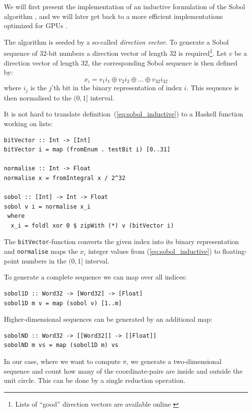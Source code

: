 \documentclass[preprint]{sigplanconf}
\begin{document}
We will first present the implementation of an inductive formulation
of the Sobol algorithm \cite{bratley1988algorithm}, and we will later get
back to a more efficient implementations optimized for GPUs
\cite[Chapter~16]{hwy2011emerald}.

The algorithm is seeded by a so-called \emph{direction vector}. To
generate a Sobol sequence of $32$-bit numbers a direction vector of
length $32$ is required\footnote{Lists of ``good'' direction vectors are
  available online \cite{homepage:sobol:directionvectors}}. Let $v$ be
a direction vector of length $32$, the corresponding Sobol sequence is
then defined by:
\begin{equation}
x_i = v_1i_1 \oplus v_2i_2 \oplus \ldots \oplus v_{32}i_{32}\label{eq:sobol_inductive}
\end{equation}
where $i_j$ is the $j$'th bit in the binary representation of index
$i$. This sequence is then normalised to the $(0,1]$ interval.

It is not hard to translate definition~(\ref{eq:sobol_inductive}) to a
Haskell function working on lists:
\begin{verbatim}
bitVector :: Int -> [Int]
bitVector i = map (fromEnum . testBit i) [0..31]

normalise :: Int -> Float
normalise x = fromIntegral x / 2^32

sobol :: [Int] -> Int -> Float
sobol v i = normalise x_i
 where
  x_i = foldl xor 0 $ zipWith (*) v (bitVector i)
\end{verbatim}
The \verb|bitVector|-function converts the given index into its binary
representation and \verb|normalise| maps the $x_i$ integer values from
(\ref{eq:sobol_inductive}) to floating-point numbers in the $(0,1]$
interval.

To generate a complete sequence we can map over all indices:
\begin{verbatim}
sobol1D :: Word32 -> [Word32] -> [Float]
sobol1D m v = map (sobol v) [1..m]
\end{verbatim}
Higher-dimensional sequences can be generated by an additional map:
\begin{verbatim}
sobolND :: Word32 -> [[Word32]] -> [[Float]]
sobolND m vs = map (sobol1D m) vs
\end{verbatim}

In our case, where we want to compute $\pi$, we generate a
two-dimensional sequence and count how many of the coordinate-pairs
are inside and outside the unit circle. This can be done by a single
reduction operation.
\end{document}
